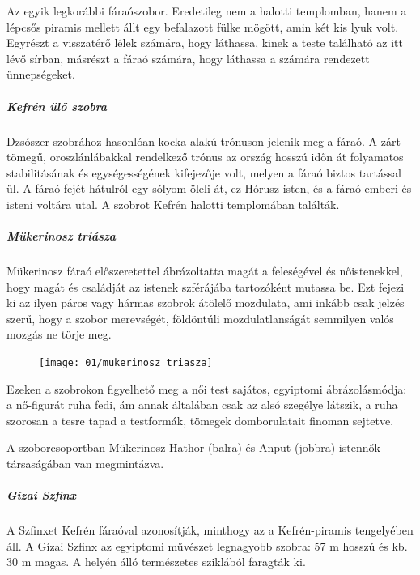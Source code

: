	Az egyik legkorábbi fáraószobor. Eredetileg nem a halotti templomban, hanem a lépcsős piramis mellett állt egy befalazott fülke mögött, amin két kis lyuk volt. Egyrészt a visszatérő lélek számára, hogy láthassa, kinek a teste található az itt lévő sírban, másrészt a fáraó számára, hogy láthassa a számára rendezett ünnepségeket.
	
	\subparagraph{Kefrén ülő szobra}
	Dzsószer szobrához hasonlóan kocka alakú trónuson jelenik meg a fáraó. A zárt tömegű, oroszlánlábakkal rendelkező trónus az ország hosszú időn át folyamatos stabilitásának és egységességének kifejezője volt, melyen a fáraó biztos tartással ül. A fáraó fejét hátulról egy sólyom öleli át, ez Hórusz isten, és a fáraó emberi és isteni voltára utal. A szobrot Kefrén halotti templomában találták.
	
	\subparagraph{Mükerinosz triásza}
	Mükerinosz fáraó előszeretettel ábrázoltatta magát a feleségével és nőistenekkel, hogy magát és családját az istenek szférájába tartozóként mutassa be. Ezt fejezi ki az ilyen páros vagy hármas szobrok átölelő mozdulata, ami inkább csak jelzés szerű, hogy a szobor merevségét, földöntúli mozdulatlanságát semmilyen valós mozgás ne törje meg.
	
	\begin{figure}
		\begin{tcolorbox}[enhanced,colframe=gray!50!white,
			colbacktitle=gray!15!white,
			coltitle=gray!50!black,
			borderline={0.5mm}{0mm}{gray!15!white},
			borderline={0.5mm}{0mm}{gray!50!white,dashed},
			attach boxed title to top center={yshift=-2mm},
			boxed title style={boxrule=0.4pt},
			title=Mükerinosz triásza]{
				\texttt{[image: 01/mukerinosz\_triasza]}}
		\end{tcolorbox}
	\end{figure} 
	
	Ezeken a szobrokon figyelhető meg a női test sajátos, egyiptomi ábrázolásmódja: a nő-figurát ruha fedi, ám annak általában csak az alsó szegélye látszik, a ruha szorosan a tesre tapad a testformák, tömegek domborulatait finoman sejtetve.
	
	A szoborcsoportban Mükerinosz Hathor (balra) és Anput (jobbra) istennők társaságában van megmintázva.
	
	\subparagraph{Gízai Szfinx}
	A Szfinxet Kefrén fáraóval azonosítják, minthogy az a Kefrén-piramis tengelyében áll. A Gízai Szfinx az egyiptomi művészet legnagyobb szobra: 57 m hosszú és kb. 30 m magas. A helyén álló természetes sziklából faragták ki.
	
